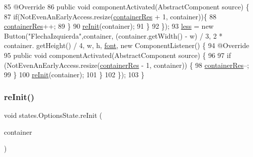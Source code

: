 \begin{DoxyCode}
85             @Override
86             \textcolor{keyword}{public} \textcolor{keywordtype}{void} componentActivated(AbstractComponent source) \{
87                 \textcolor{keywordflow}{if}(NotEvenAnEarlyAccess.resize(\mbox{\hyperlink{classstates_1_1_options_state_aac5803e0583bd7dc8e5e1a9327d9a0c0}{containerRes}} + 1, container))\{
88                     \mbox{\hyperlink{classstates_1_1_options_state_aac5803e0583bd7dc8e5e1a9327d9a0c0}{containerRes}}++;
89                 \}
90                 \mbox{\hyperlink{classstates_1_1_options_state_acf38025ae1ce24fe71018bc2f0918fcf}{reInit}}(container);
91             \}
92         \});
93         \mbox{\hyperlink{classstates_1_1_options_state_a1f00eafc225107c0e4665632a30e0718}{less}} = \textcolor{keyword}{new} Button(\textcolor{stringliteral}{"FlechaIzquierda"},container, (container.getWidth() - w) / 3, 2 * container.
      getHeight() / 4, w, h, \mbox{\hyperlink{classstates_1_1_options_state_a6a6834f7d7a3704e0a42aac50a50ae3f}{font}}, \textcolor{keyword}{new} ComponentListener() \{
94             @Override
95             \textcolor{keyword}{public} \textcolor{keywordtype}{void} componentActivated(AbstractComponent source) \{
96                 
97                 \textcolor{keywordflow}{if} (NotEvenAnEarlyAccess.resize(\mbox{\hyperlink{classstates_1_1_options_state_aac5803e0583bd7dc8e5e1a9327d9a0c0}{containerRes}} - 1, container)) \{
98                     \mbox{\hyperlink{classstates_1_1_options_state_aac5803e0583bd7dc8e5e1a9327d9a0c0}{containerRes}}--;
99                 \}
100                 \mbox{\hyperlink{classstates_1_1_options_state_acf38025ae1ce24fe71018bc2f0918fcf}{reInit}}(container);
101             \}
102         \});
103     \}
\end{DoxyCode}
\mbox{\label{classstates_1_1_options_state_acf38025ae1ce24fe71018bc2f0918fcf}} 
\subsubsection{\texorpdfstring{re\+Init()}{reInit()}}
{\footnotesize\ttfamily void states.\+Options\+State.\+re\+Init (\begin{DoxyParamCaption}\item[{\mbox{\hyperlink{classorg_1_1newdawn_1_1slick_1_1_game_container}{Game\+Container}}}]{container }\end{DoxyParamCaption})\hspace{0.3cm}{\ttfamily [inline]}}


